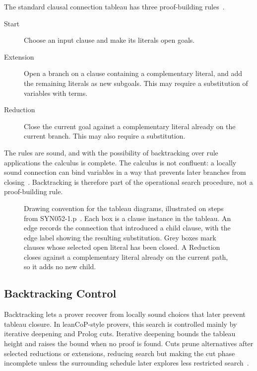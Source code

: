 \documentclass{EasyChair3.5/easychair}
\newcommand{\step}[1]{\textsf{#1}}
\newcommand{\cop}[1]{\textsf{#1}}
\begin{document}
The standard clausal connection tableau has three proof-building rules~\cite{connectiontableaux,ottenSyntaxConnectionProofs2023}.
\begin{description}
	\item[\cop{Start}] Choose an input clause and make its literals open goals.
	\item[\cop{Extension}] Open a branch on a clause containing a complementary literal, and add the remaining literals as new subgoals.
		This may require a substitution of variables with terms.
	\item[\cop{Reduction}] Close the current goal against a complementary literal already on the current branch.
		This may also require a substitution.
\end{description}

The rules are sound, and with the possibility of backtracking over rule applications the calculus is complete.
The calculus is not confluent: a locally sound connection can bind variables in a way that prevents later branches from closing~\cite{connectiontableaux}.
Backtracking is therefore part of the operational search procedure, not a proof-building rule.


\begin{figure}[h]
	\centering
	\framebox[\linewidth][c]{}
	\caption{Drawing convention for the tableau diagrams, illustrated on steps from \cop{SYN052-1.p}~\cite{Pelletier86}. Each box is a clause instance in the tableau. An edge records the connection that introduced a child clause, with the edge label showing the resulting substitution. Grey boxes mark clauses whose selected open literal has been closed. A \step{Reduction} closes against a complementary literal already on the current path, so it adds no new child.}
\end{figure}

\subsection{Backtracking Control}

Backtracking lets a prover recover from locally sound choices that later prevent tableau closure.
In \cop{leanCoP}-style provers, this search is controlled mainly by iterative deepening and Prolog cuts.
Iterative deepening bounds the tableau height and raises the bound when no proof is found.
Cuts prune alternatives after selected reductions or extensions, reducing search but making the cut phase incomplete unless the surrounding schedule later explores less restricted search~\cite{leancopcut}.
\end{document}
